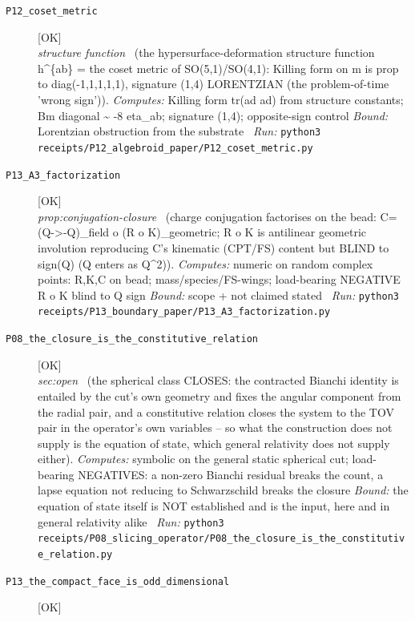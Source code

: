 \begin{description}
\item[\label{rcpt:P12_coset_metric}\texttt{P12\_coset\_metric}]\hfill\textsf{[OK]}\\
\textit{structure function} \ (the hypersurface-deformation structure function h\textasciicircum{}\{ab\} = the coset metric of SO(5,1)/SO(4,1): Killing form on m is prop to diag(-1,1,1,1,1), signature (1,4) LORENTZIAN (the problem-of-time 'wrong sign')). 
\emph{Computes:} Killing form tr(ad ad) from structure constants; B\textbar{}m diagonal \textasciitilde{} -8 eta\_ab; signature (1,4); opposite-sign control
 \emph{Bound:} Lorentzian obstruction from the substrate
\ \emph{Run:} \texttt{python3 receipts/P12\_algebroid\_paper/P12\_coset\_metric.py}
\item[\label{rcpt:P13_A3_factorization}\texttt{P13\_A3\_factorization}]\hfill\textsf{[OK]}\\
\textit{prop:conjugation-closure} \ (charge conjugation factorises on the bead: C=(Q->-Q)\_field o (R o K)\_geometric; R o K is antilinear geometric involution reproducing C's kinematic (CPT/FS) content but BLIND to sign(Q) (Q enters as Q\textasciicircum{}2)). 
\emph{Computes:} numeric on random complex points: R,K,C on bead; \textbar{}mass\textbar{}/species/FS-wings; load-bearing NEGATIVE R o K blind to Q sign
 \emph{Bound:} scope + not claimed stated
\ \emph{Run:} \texttt{python3 receipts/P13\_boundary\_paper/P13\_A3\_factorization.py}
\item[\label{rcpt:P08_the_closure_is_the_constitutive_relation}\texttt{P08\_the\_closure\_is\_the\_constitutive\_relation}]\hfill\textsf{[OK]}\\
\textit{sec:open} \ (the spherical class CLOSES: the contracted Bianchi identity is entailed by the cut's own geometry and fixes the angular component from the radial pair, and a constitutive relation closes the system to the TOV pair in the operator's own variables -- so what the construction does not supply is the equation of state, which general relativity does not supply either). 
\emph{Computes:} symbolic on the general static spherical cut; load-bearing NEGATIVES: a non-zero Bianchi residual breaks the count, a lapse equation not reducing to Schwarzschild breaks the closure
 \emph{Bound:} the equation of state itself is NOT established and is the input, here and in general relativity alike
\ \emph{Run:} \texttt{python3 receipts/P08\_slicing\_operator/P08\_the\_closure\_is\_the\_constitutive\_relation.py}
\item[\label{rcpt:P13_the_compact_face_is_odd_dimensional}\texttt{P13\_the\_compact\_face\_is\_odd\_dimensional}]\hfill\textsf{[OK]}\\

\end{description}
